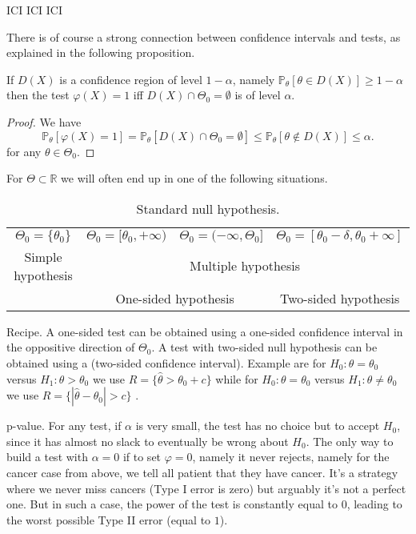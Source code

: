 \documentclass[
	fontsize=11pt, %
	twoside=false, %
	numbers=noenddot, %
]{kaobook}
\renewcommand{\P}{\mathbb P}
\newcommand{\R}{\mathbb R}
\newcommand{\wh}{\widehat}
\begin{document}
ICI ICI ICI

There is of course a strong connection between confidence intervals and tests, as explained in the following proposition.
\begin{proposition}
	If $D(X)$ is a confidence region of level $1 - \alpha$, namely $\P_\theta[ \theta \in D(X)] \geq 1 - \alpha$ then the test $\varphi(X) = 1$ iff $D(X) \cap \Theta_0  = \emptyset$ is of level $\alpha$.
\end{proposition}
\begin{proof}
	We have
	\begin{equation*}
		\P_\theta [\varphi(X) = 1] = \P_\theta[ D(X) \cap \Theta_0 = \emptyset] \leq \P_\theta[ \theta \notin D(X) ] \leq \alpha.
	\end{equation*}
	for any $\theta \in \Theta_0$.
\end{proof}

For $\Theta \subset \R$ we will often end up in one of the following situations.

\begin{table}
\begin{tabular}{|c|c|c|c|}
	$\Theta_0 = \{ \theta_0 \}$ & $\Theta_0 = [\theta_0, +\infty)$ & $\Theta_0 = (-\infty, \Theta_0]$ & $\Theta_0 = [\theta_0 - \delta, \theta_0 + \infty]$ \\
	Simple hypothesis & \multicolumn{3}{c}{Multiple hypothesis} \\
	& \multicolumn{2}{c}{One-sided hypothesis} & Two-sided hypothesis
\end{tabular}
	\caption{Standard null hypothesis.}
	\label{tab:standard-null-hypothesis}
\end{table}

Recipe. A one-sided test can be obtained using a one-sided confidence interval in the oppositive direction of $\Theta_0$. A test with two-sided null hypothesis can be obtained using a (two-sided confidence interval).
Example are for $H_0 : \theta = \theta_0$ versus $H_1 : \theta > \theta_0$ we use $R = \{ \wh \theta > \theta_0 + c \}$ while for $H_0 : \theta = \theta_0$ versus $H_1 : \theta \neq \theta_0$ we use $R = \{ | \wh \theta - \theta_0 | > c \}$ .



p-value. For any test, if $\alpha$ is very small, the test has no choice but to accept $H_0$, since it has almost no slack to eventually be wrong about $H_0$.
The only way to build a test with $\alpha = 0$ if to set $\varphi = 0$, namely it never rejects, namely for the cancer case from above, we tell all patient that they have cancer. It's a strategy where we never miss cancers (Type I error is zero)
but arguably it's not a perfect one.
But in such a case, the power of the test is constantly equal to $0$, leading to the worst possible Type II error (equal to $1$).
\end{document}
